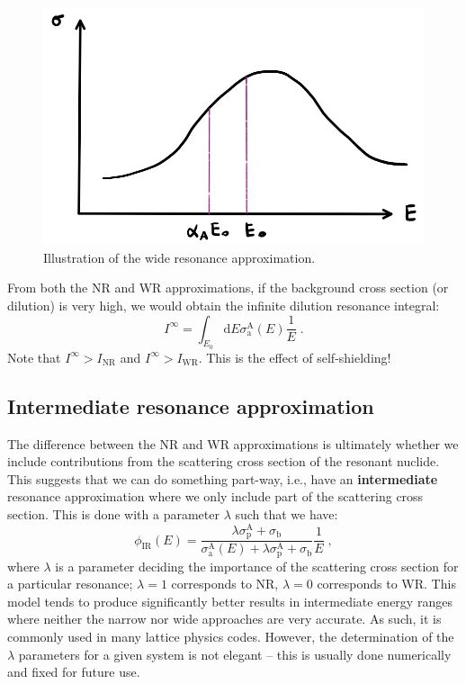 \begin{figure}[h]
  \centering
  \includegraphics[scale=0.60]{./Figures/P4/scatterWR.png} 
  \caption{Illustration of the wide resonance approximation.} 
  \label{fig:WR}
\end{figure}
From both the NR and WR approximations, if the background cross section (or dilution) is very high, we would obtain the infinite dilution resonance integral:
\begin{equation*}
    I^\infty = \int_{E_0}\mathrm{d}E \sigma^\mathrm{A}_\mathrm{a}(E)\frac{1}{E}\;\mathrm{.}
\end{equation*}
Note that $I^\infty > I_\mathrm{NR}$ and $I^\infty > I_\mathrm{WR}$. This is the effect of self-shielding!

\subsection{Intermediate resonance approximation}

The difference between the NR and WR approximations is ultimately whether we include contributions from the scattering cross section of the resonant nuclide. This suggests that we can do something part-way, i.e., have an \textbf{intermediate} resonance approximation where we only include part of the scattering cross section. This is done with a parameter $\lambda$ such that we have:
\begin{equation*}
    \phi_\mathrm{IR}(E) =  \frac{\lambda\sigma^\mathrm{A}_\mathrm{p} + \sigma_\mathrm{b}}{\sigma^\mathrm{A}_\mathrm{a}(E) + \lambda\sigma^\mathrm{A}_\mathrm{p} +  \sigma_\mathrm{b}}\frac{1}{E}\;\mathrm{,}
\end{equation*}
where $\lambda$ is a parameter deciding the importance of the scattering cross section for a particular resonance; $\lambda =1$ corresponds to NR, $\lambda=0$ corresponds to WR. This model tends to produce significantly better results in intermediate energy ranges where neither the narrow nor wide approaches are very accurate. As such, it is commonly used in many lattice physics codes. However, the determination of the $\lambda$ parameters for a given system is not elegant -- this is usually done numerically and fixed for future use.
